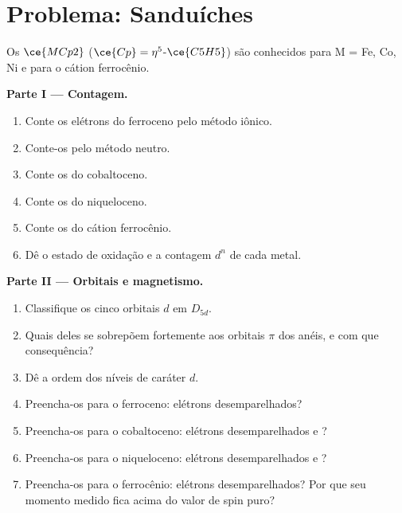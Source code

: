\section{Problema: Sanduíches}

\begin{problem}
\label{pb:b3:organometallic-bonding:1}
Os  $\ce{MCp2}$ ($\ce{Cp} = \eta^5$-$\ce{C5H5}$) são conhecidos para M = Fe, Co, Ni e para o cátion ferrocênio.

\medskip\noindent\textbf{Parte I --- Contagem.}
\begin{enumerate}
  \item Conte os elétrons do ferroceno pelo método iônico.
  \item Conte-os pelo método neutro.
  \item Conte os do cobaltoceno.
  \item Conte os do niqueloceno.
  \item Conte os do cátion ferrocênio.
  \item Dê o estado de oxidação e a contagem $d^n$ de cada metal.
\end{enumerate}

\medskip\noindent\textbf{Parte II --- Orbitais e magnetismo.}
\begin{enumerate}[resume]
  \item Classifique os cinco orbitais $d$ em $D_{5d}$.
  \item Quais deles se sobrepõem fortemente aos orbitais $\pi$ dos anéis, e com que
        consequência?
  \item Dê a ordem dos níveis de caráter $d$.
  \item Preencha-os para o ferroceno: elétrons desemparelhados?
  \item Preencha-os para o cobaltoceno: elétrons desemparelhados e ?
  \item Preencha-os para o niqueloceno: elétrons desemparelhados e ?
  \item Preencha-os para o ferrocênio: elétrons desemparelhados? Por que seu momento medido
        fica acima do valor de spin puro?
\end{enumerate}


\end{problem}
